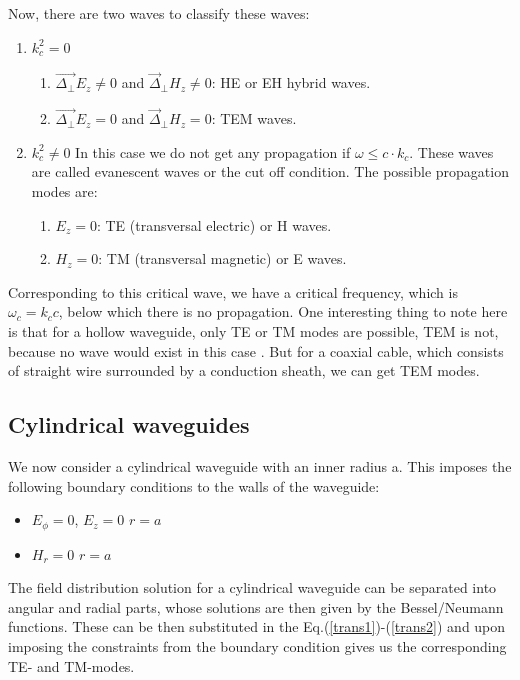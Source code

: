 \documentclass[a4paper]{report}
\numberwithin{equation}{section}
\begin{document}
Now, there are two waves to classify these waves: 
\begin{enumerate}
		\item $k_{c}^2 = 0  $ 
				\begin{enumerate}
						\item $\vec{\Delta_{\perp} }E_{z}  \ne 0$ and
						$\vec{\Delta}_{\perp}H_{z} \ne 0  $: HE or EH hybrid
						waves.
						\item $\vec{\Delta_{\perp} }E_{z}  = 0$ and
						$\vec{\Delta}_{\perp}H_{z} = 0  $: TEM waves.
				\end{enumerate}
		\item $k_{c}^2 \ne 0  $ In this case we do not get any propagation if
		$\omega \leq c \cdot k_{c} $. These waves are called evanescent waves or
		the cut off condition. The possible propagation modes are: 
		\begin{enumerate}
				\item $E_{z}=0 $: TE (transversal electric) or H waves.
				\item $H_{z}=0 $: TM (transversal magnetic) or E waves.
		\end{enumerate}
		
\end{enumerate}

Corresponding to this critical wave, we have a critical frequency, which is
$\omega_{c}=k_{c} c $, below which there is no propagation. One interesting
thing to note here is that for a hollow waveguide, only TE or TM modes are
possible, TEM is not, because no wave would exist in this case \cite{Griffiths}. But for
a coaxial cable, which consists of straight wire surrounded by a conduction
sheath, we can get TEM modes.

\subsection{Cylindrical waveguides}
We now consider a cylindrical waveguide with an inner radius a. This imposes the
following boundary conditions to the walls of the waveguide:
\begin{itemize}
		\item $E_{\phi} = 0$, $E_{z} = 0 $  $r = a$ 
		\item $H_{r} = 0 $  $r = a$ 
\end{itemize}

The field distribution solution for a cylindrical waveguide can be separated
into angular and radial parts, whose solutions are then given by the
Bessel/Neumann functions. These can be then substituted in the
Eq.(\ref{trans1})-(\ref{trans2}) and upon imposing the constraints from the
boundary condition gives us the corresponding TE- and TM-modes.
\end{document}
